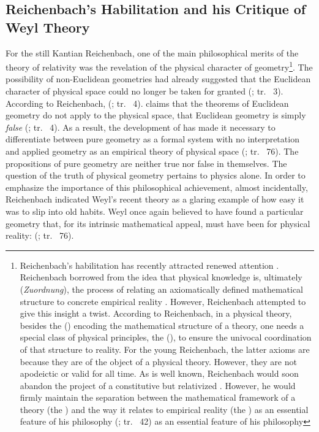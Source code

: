 \documentclass[final]{article}
\newcommand{\rhp}[2]{(\cite[#1]{Reichenbach1920a}; tr.\ \citeyear{Reichenbach1969} #2)\xspace}
\begin{document}
\subsection{Reichenbach's Habilitation and his Critique of Weyl Theory}


For the still Kantian Reichenbach, one of the main philosophical merits of the theory of relativity was the revelation of the physical character of geometry\footnote{Reichenbach's habilitation has recently attracted renewed attention \citep{Friedman2001}. Reichenbach borrowed from \citet{Schlick1918} the idea that physical knowledge is, ultimately (\emph{Zuordnung}), the process of relating an axiomatically defined mathematical structure to concrete empirical reality \citep{Padovani2009}. However, Reichenbach attempted to give this insight a  twist. According to Reichenbach, in a physical theory, besides the  () encoding the mathematical structure of a theory, one needs a special class of physical principles, the  (), to ensure the univocal coordination of that structure to reality. For the young Reichenbach, the latter axioms are \apr because they are  of the object of a physical theory. However, they are not apodeictic or valid for all time. As is well known, Reichenbach would soon abandon the project of a constitutive but relativized \apr. However, he would firmly maintain the separation between the mathematical framework of a theory (the ) and the way it relates to empirical reality (the ) as an essential feature of his philosophy \rhp{40}{42} as an essential feature of his philosophy}. The possibility of non-Euclidean geometries had already suggested that the Euclidean character of physical space could no longer be taken for granted \rhp{3}{3}. According to Reichenbach,  \rhp{3}{4}. \Rt claims that the theorems of Euclidean geometry do not apply to the physical space, that Euclidean geometry is simply \emph{false} \rhp{3}{4}. As a result, the development of \rt has made it necessary to differentiate between pure geometry as a formal system with no interpretation and applied geometry as an empirical theory of physical space \rhp{73}{76}. The propositions of pure geometry are neither true nor false in themselves. The question of the truth of physical geometry pertains to physics alone. In order to emphasize the importance of this philosophical achievement, almost incidentally, Reichenbach indicated Weyl's recent theory as a glaring example of how easy it was to slip into old habits. Weyl once again believed to have found a particular geometry that, for its intrinsic mathematical appeal, must have been  for physical reality:  \rhp{73}{76}.
\end{document}
